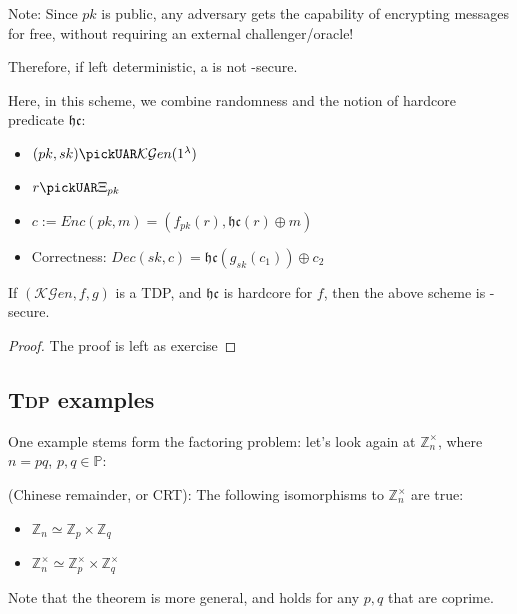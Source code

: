 Note: Since $pk$ is public, any adversary gets the capability of encrypting messages for free, without requiring an external challenger/oracle!

Therefore, if left deterministic, a \tdp{} is not \cpa-secure.

Here, in this scheme, we combine randomness and the notion of hardcore predicate $\mathfrak{hc}$:

\begin{itemize}
    \item $(pk, sk) \pickUAR \mathcal{KG}en(1^\lambda)$
    \item $r \pickUAR \Xi_{pk}$
    \item $c := Enc(pk, m) = (f_{pk}(r), \mathfrak{hc}(r) \oplus m)$
    \item Correctness: $Dec(sk, c) = \mathfrak{hc}(g_{sk}(c_1)) \oplus c_2$
\end{itemize}

\begin{theorem}
    If $(\mathcal{KG}en, f, g)$ is a TDP, and $\mathfrak{hc}$ is hardcore for $f$, then the above scheme is \cpa-secure.    
\end{theorem}

\begin{proof} The proof is left as exercise

\end{proof}

\subsection{\textsc{Tdp} examples}

One example stems form the factoring problem: let's look again at $\mathbb{Z}_n^\times$, where $n = pq$, $p, q \in \mathbb{P}$:

\begin{theorem}
    (Chinese remainder, or CRT): The following isomorphisms to $\mathbb{Z}_n^\times$ are true:

\begin{itemize}
    \item $\mathbb{Z}_n \simeq \mathbb{Z}_p \times \mathbb{Z}_q$
    \item $\mathbb{Z}_n^\times \simeq \mathbb{Z}_p^\times \times \mathbb{Z}_q^\times$
\end{itemize}

Note that the theorem is more general, and holds for any $p, q$ that are coprime.
\end{theorem}


